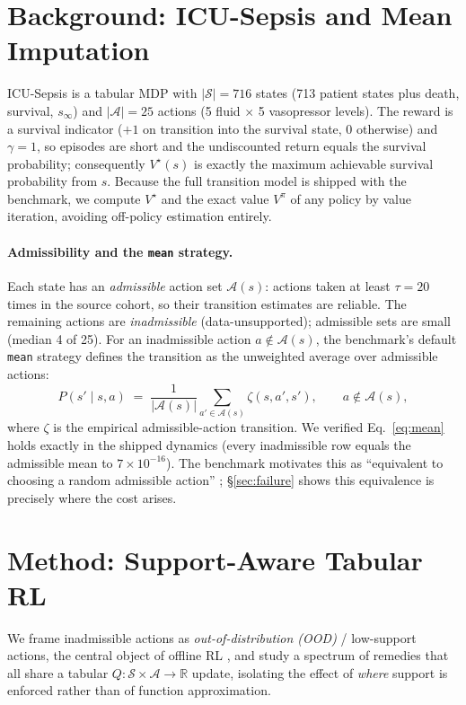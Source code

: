 \documentclass{article}
\newcommand{\Adm}{\mathcal{A}}
\begin{document}
\section{Background: ICU-Sepsis and Mean Imputation}
\label{sec:background}
ICU-Sepsis \citep{choudhary2024icusepsis} is a tabular MDP with $|\mathcal{S}|{=}716$
states (713 patient states plus death, survival, $s_\infty$) and $|\mathcal{A}|{=}25$
actions (5 fluid $\times$ 5 vasopressor levels). The reward is a survival indicator
(${+}1$ on transition into the survival state, $0$ otherwise) and $\gamma{=}1$, so
episodes are short and the undiscounted return equals the survival probability;
consequently $V^\star(s)$ is exactly the maximum achievable survival probability
from $s$. Because the full transition model is shipped with the benchmark, we
compute $V^\star$ and the exact value $V^\pi$ of any policy by value iteration,
avoiding off-policy estimation entirely.

\paragraph{Admissibility and the \texttt{mean} strategy.}
Each state has an \emph{admissible} action set $\Adm(s)$: actions taken at least
$\tau{=}20$ times in the source cohort, so their transition estimates are reliable.
The remaining actions are \emph{inadmissible} (data-unsupported); admissible sets
are small (median 4 of 25). For an inadmissible action $a\notin\Adm(s)$, the
benchmark's default \texttt{mean} strategy defines the transition as the unweighted
average over admissible actions:
\begin{equation}
\label{eq:mean}
P(s'\mid s,a) \;=\; \frac{1}{|\Adm(s)|}\sum_{a'\in\Adm(s)} \zeta(s,a',s'),
\qquad a\notin\Adm(s),
\end{equation}
where $\zeta$ is the empirical admissible-action transition. We verified
Eq.~\eqref{eq:mean} holds exactly in the shipped dynamics (every inadmissible row
equals the admissible mean to $7\times10^{-16}$). The benchmark motivates this as
``equivalent to choosing a random admissible action'' \citep{choudhary2024icusepsis};
\S\ref{sec:failure} shows this equivalence is precisely where the cost arises.

\section{Method: Support-Aware Tabular RL}
\label{sec:method}
We frame inadmissible actions as \emph{out-of-distribution (OOD)} / low-support
actions, the central object of offline RL \citep{fujimoto2019bcq,kumar2020cql},
and study a spectrum of remedies that all share a tabular $Q:\mathcal{S}\times
\mathcal{A}\to\mathbb{R}$ update, isolating the effect of \emph{where} support is
enforced rather than of function approximation.
\end{document}
